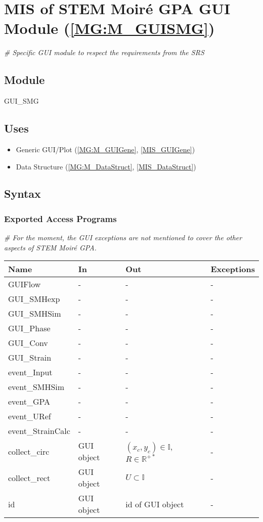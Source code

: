 \documentclass[12pt, titlepage]{article}
\newcommand{\progname}{STEM Moir{\'e} GPA}
\begin{document}
\section{MIS of STEM Moir{\'e} GPA GUI Module (\texorpdfstring{\cref{MG:M_GUISMG}}))} \label{MIS_GUISMG}

\noindent\textit{{\#} Specific GUI module to respect the requirements from the 
SRS}\medskip

\subsection{Module}
GUI{\_}SMG
\subsection{Uses}
\begin{itemize}
\item Generic GUI/Plot (\cref{MG:M_GUIGene}, \cref{MIS_GUIGene})
\item Data Structure (\cref{MG:M_DataStruct}, \cref{MIS_DataStruct})
\end{itemize}

\subsection{Syntax}

\subsubsection{Exported Access Programs}

\noindent\textit{{\#} For the moment, the GUI exceptions are not mentioned to 
cover the other aspects of \progname{}.}\medskip

\begin{center}
\begin{tabular}{p{4cm} p{3cm} p{3cm} p{3cm}}
\hline
\textbf{Name} & \textbf{In} & \textbf{Out} & \textbf{Exceptions} \\
\hline
GUIFlow & - & - & - \\
GUI{\_}SMHexp & - & - & - \\
GUI{\_}SMHSim & - & - & - \\
GUI{\_}Phase & - & - & - \\
GUI{\_}Conv & - & - & - \\
GUI{\_}Strain & - & - & - \\
event{\_}Input & - & - & - \\
event{\_}SMHSim & - & - & - \\
event{\_}GPA & - & - & - \\
event{\_}URef & - & - & - \\
event{\_}StrainCalc & - & - & - \\
collect{\_}circ & GUI object & $(x_c,y_c)\in\mathbb{I}$,$R \in\mathbb{R}^{+*}$ & 
- \\
collect{\_}rect & GUI object & $U \subset \mathbb{I}$ & -\\
id & GUI object & id of GUI object & - \\
\hline
\end{tabular}
\end{center}
\end{document}
